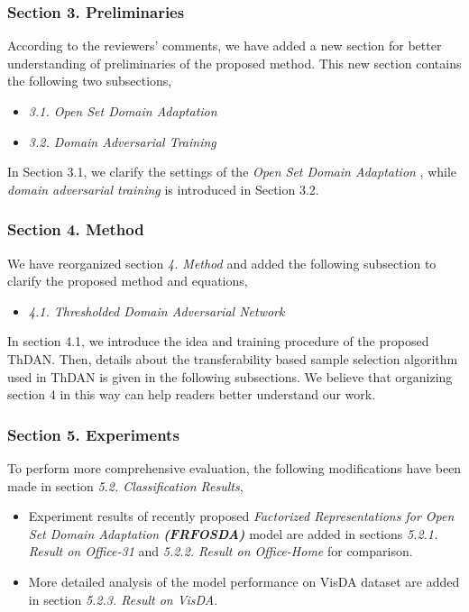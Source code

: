 

\newpage
\subsubsection*{{\textbf{Section 3. Preliminaries}}}
According to the reviewers' comments, we have added a new section for better understanding of preliminaries of the proposed method. 
This new section contains the following two subsections,
\begin{itemize}[topsep=0pt]
    \small
    \item \textit{3.1. Open Set Domain Adaptation}
    \item \textit{3.2. Domain Adversarial Training}
\end{itemize}
In Section 3.1, we clarify the settings of the \textit{Open Set Domain Adaptation} \cite{OpensetDA-bp}, while \textit{domain adversarial training} \cite{DomainAdversrialNetwork} is introduced in Section 3.2.


\subsubsection*{{\textbf{Section 4. Method }}}
We have reorganized section \textit{4. Method} and added the following subsection to clarify the proposed method and equations,
\begin{itemize}[topsep=0pt]
    \small
    \item \textit{4.1. Thresholded Domain Adversarial Network}
\end{itemize}
In section 4.1, we introduce the idea and training procedure of the proposed ThDAN.
Then, details about the transferability based sample selection algorithm used in ThDAN is given in the following subsections.
We believe that organizing section 4 in this way can help readers better understand our work.

\subsubsection*{{\textbf{Section 5. Experiments}}}
To perform more comprehensive evaluation, the following modifications have been made in section \textit{5.2. Classification Results},
\begin{itemize}[topsep=0pt]
    \small
    \item Experiment results of recently proposed \textit{Factorized Representations for Open Set Domain Adaptation \textbf{(FRFOSDA)}} model \cite{PDA-fac} are added in sections \textit{5.2.1. Result on Office-31} and \textit{5.2.2. Result on Office-Home} for comparison.
    \item More detailed analysis of the model performance on VisDA dataset are added in section \textit{5.2.3. Result on VisDA}.
\end{itemize}

